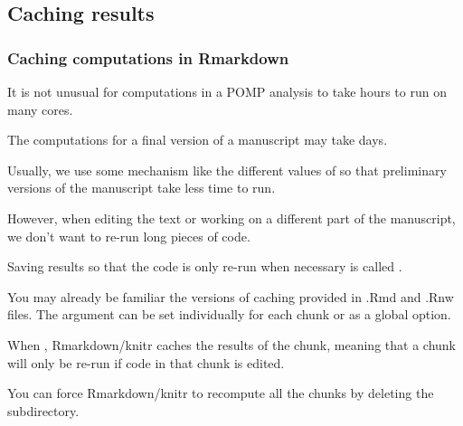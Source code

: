 \subsection*{Caching results}

\begin{frame}[fragile]
\frametitle{Caching computations in Rmarkdown}

\bi

\item  It is not unusual for computations in a POMP analysis to take hours to run on many cores.

\item  The computations for a final version of a manuscript may take days.

\item  Usually, we use some mechanism like the different values of  so that preliminary versions of the manuscript take less time to run.

\item  However, when editing the text or working on a different part of the manuscript, we don't want to re-run long pieces of code.

\item  Saving results so that the code is only re-run when necessary is called .

\ei

\end{frame}

\begin{frame}[fragile]
\bi
\item  You may already be familiar the versions of caching provided in {.Rmd} and {.Rnw} files. The argument  can be set individually for each chunk or as a global option.

\item  When , Rmarkdown/knitr caches the results of the chunk, meaning that a chunk will only be re-run if code in that chunk is edited.

\item  You can force Rmarkdown/knitr to recompute all the chunks by deleting the  subdirectory.
\ei
\end{frame}



